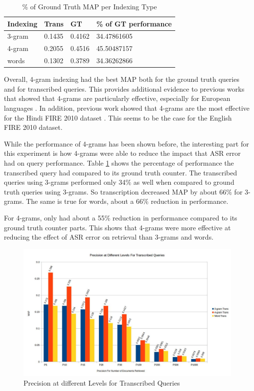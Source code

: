 \documentclass[jair, twoside,11pt,theapa]{article}
\begin{document}
\begin{table}[]
\centering
\caption{\% of Ground Truth MAP per Indexing Type}
\label{MAP_mitigation}
\begin{tabular}{|l|l|l|l|}
\hline
Indexing & Trans  & GT     & \% of GT performance      \\ \hline
3-gram    & 0.1435 & 0.4162 & 34.47861605 \\ \hline
4-gram    & 0.2055 & 0.4516 & 45.50487157 \\ \hline
words    & 0.1302 & 0.3789 & 34.36262866 \\ \hline
\end{tabular}
\end{table}

Overall, 4-gram indexing had the best MAP both for the ground truth queries and for transcribed queries. This provides additional evidence to previous works that showed that 4-grams are particularly effective, especially for European languages \cite{McNamee2004}. In addition, previous work showed that 4-grams are the most effective for the Hindi FIRE 2010 dataset \cite{Vishwakarma}. This seems to be the case for the English FIRE 2010 dataset. 

While the performance of 4-grams has been shown before, the interesting part for this experiment is how 4-grams were able to reduce the impact that ASR error had on query performance. Table \ref{MAP_mitigation} shows the percentage of performance the transcribed query had compared to its ground truth counter. The transcribed queries using 3-grams performed only 34\% as well when compared to ground truth queries using 3-grams. So transcription decreased MAP by about 66\% for 3-grams. The same is true for words, about a 66\% reduction in performance. 

For 4-grams, only had about a 55\% reduction in performance compared to its ground truth counter parts. This shows that 4-grams were more effective at reducing the effect of ASR error on retrieval than 3-grams and words. 

\begin{figure}
\centering
\includegraphics[width=1.0\linewidth]{../ResultImages/Precisions}
\caption{Precision at different Levels for Transcribed Queries}
\label{fig:Precisions}
\end{figure}
\end{document}
